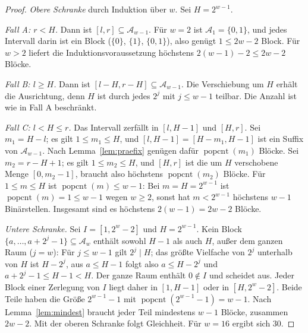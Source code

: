 \documentclass[a4paper,12pt, twoside]{report}
\theoremstyle{definition}
\DeclareMathOperator{\popcnt}{popcnt}
\begin{document}
\begin{proof}
	\emph{Obere Schranke} durch Induktion über $w$. Sei $H=2^{w-1}$.

	\emph{Fall A: $r<H$.} Dann ist $[l,r]\subseteq\mathcal{A}_{w-1}$. Für $w=2$ ist $\mathcal{A}_1=\{0,1\}$, und jedes Intervall darin ist ein Block ($\{0\}$, $\{1\}$, $\{0,1\}$), also genügt $1\le 2w-2$ Block. Für $w>2$ liefert die Induktionsvoraussetzung höchstens $2(w-1)-2\le 2w-2$ Blöcke.

	\emph{Fall B: $l\ge H$.} Dann ist $[l-H,r-H]\subseteq\mathcal{A}_{w-1}$. Die Verschiebung um $H$ erhält die Ausrichtung, denn $H$ ist durch jedes $2^j$ mit $j\le w-1$ teilbar. Die Anzahl ist wie in Fall A beschränkt.

	\emph{Fall C: $l<H\le r$.} Das Intervall zerfällt in $[l,H-1]$ und $[H,r]$. Sei $m_1=H-l$; es gilt $1\le m_1\le H$, und $[l,H-1]=[H-m_1,H-1]$ ist ein Suffix von $\mathcal{A}_{w-1}$. Nach Lemma~\ref{lem:praefix} genügen dafür $\popcnt(m_1)$ Blöcke. Sei $m_2=r-H+1$; es gilt $1\le m_2\le H$, und $[H,r]$ ist die um $H$ verschobene Menge $[0,m_2-1]$, braucht also höchstens $\popcnt(m_2)$ Blöcke. Für $1\le m\le H$ ist $\popcnt(m)\le w-1$: Bei $m=H=2^{w-1}$ ist $\popcnt(m)=1\le w-1$ wegen $w\ge2$, sonst hat $m<2^{w-1}$ höchstens $w-1$ Binärstellen. Insgesamt sind es höchstens $2(w-1)=2w-2$ Blöcke.

	\emph{Untere Schranke.} Sei $I=[1,2^w-2]$ und $H=2^{w-1}$. Kein Block $\{a,\ldots,a+2^j-1\}\subseteq\mathcal{A}_w$ enthält sowohl $H-1$ als auch $H$, außer dem ganzen Raum ($j=w$): Für $j\le w-1$ gilt $2^j\mid H$; das größte Vielfache von $2^j$ unterhalb von $H$ ist $H-2^j$, aus $a\le H-1$ folgt also $a\le H-2^j$ und $a+2^j-1\le H-1<H$. Der ganze Raum enthält $0\notin I$ und scheidet aus. Jeder Block einer Zerlegung von $I$ liegt daher in $[1,H-1]$ oder in $[H,2^w-2]$. Beide Teile haben die Größe $2^{w-1}-1$ mit $\popcnt(2^{w-1}-1)=w-1$. Nach Lemma~\ref{lem:mindest} braucht jeder Teil mindestens $w-1$ Blöcke, zusammen $2w-2$. Mit der oberen Schranke folgt Gleichheit. Für $w=16$ ergibt sich $30$.
\end{proof}
\end{document}
